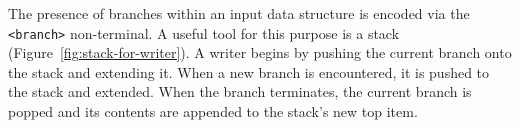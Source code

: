 \documentclass{article}
\def\ttt{\texttt}
\begin{document}
The presence of branches within an input data structure is encoded via the \ttt{<branch>} non-terminal. A useful tool for this purpose is a stack (Figure~\ref{fig:stack-for-writer}). A writer begins by pushing the current branch onto the stack and extending it. When a new branch is encountered, it is pushed to the stack and extended. When the branch terminates, the current branch is popped and its contents are appended to the stack's new top item.

\end{document}

